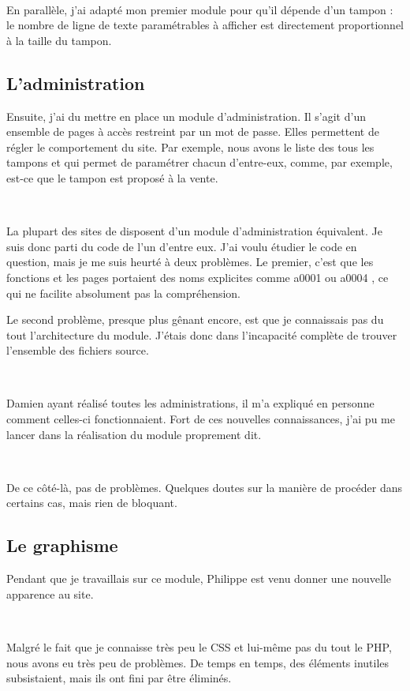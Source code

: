 ~

En parallèle, j'ai adapté mon premier module pour qu'il dépende d'un tampon : le nombre de ligne de texte paramétrables à afficher est directement proportionnel à la taille du tampon.

\subsection{L'administration}
Ensuite, j'ai du mettre en place un module d'administration. Il s'agit d'un ensemble de pages à accès restreint par un mot de passe. Elles permettent de régler le comportement du site. Par exemple, nous avons le liste des tous les tampons et qui permet de paramétrer chacun d'entre-eux, comme, par exemple, est-ce que le tampon est proposé à la vente.

~

La plupart des sites de \fidit{} disposent d'un module d'administration équivalent. Je suis donc parti du code de l'un d'entre eux. J'ai voulu étudier le code en question, mais je me suis heurté à deux problèmes. Le premier, c'est que les fonctions et les pages portaient des noms explicites comme \og a0001 \fg ou \og a0004 \fg, ce qui ne facilite absolument pas la compréhension.

Le second problème, presque plus gênant encore, est que je connaissais pas du tout l'architecture du module. J'étais donc dans l'incapacité complète de trouver l'ensemble des fichiers source.

~

Damien ayant réalisé toutes les administrations, il m'a expliqué en personne comment celles-ci fonctionnaient. Fort de ces nouvelles connaissances, j'ai pu me lancer dans la réalisation du module proprement dit.

~

De ce côté-là, pas de problèmes. Quelques doutes sur la manière de procéder dans certains cas, mais rien de bloquant.

\subsection{Le graphisme}
Pendant que je travaillais sur ce module, Philippe est venu donner une nouvelle apparence au site.

~

Malgré le fait que je connaisse très peu le CSS et lui-même pas du tout le PHP, nous avons eu très peu de problèmes. De temps en temps, des éléments inutiles subsistaient, mais ils ont fini par être éliminés.

